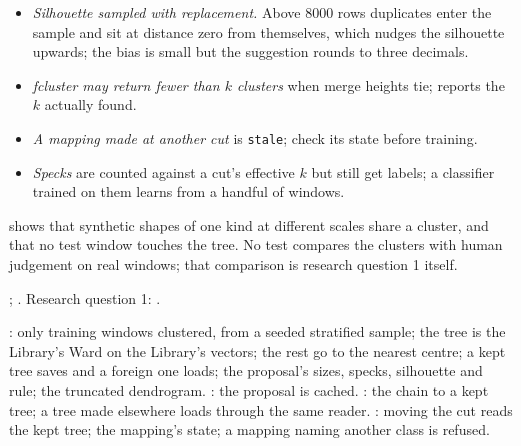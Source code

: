 \begin{itemize}
\item \emph{Silhouette sampled with replacement.} Above 8000 rows duplicates enter the sample and
  sit at distance zero from themselves, which nudges the silhouette upwards; the bias is small but
  the suggestion rounds to three decimals.
\item \emph{fcluster may return fewer than $k$ clusters} when merge heights tie; 
  reports the $k$ actually found.
\item \emph{A mapping made at another cut} is \texttt{stale}; check its state before training.
\item \emph{Specks} are counted against a cut's effective $k$ but still get labels; a classifier
  trained on them learns from a handful of windows.
\end{itemize}

 shows that synthetic shapes of one kind at different scales
share a cluster, and that no test window touches the tree. No test compares the clusters with
human judgement on real windows; that comparison is research question 1 itself.

\citet{ward1963hierarchical}; \citet{rousseeuw1987silhouettes}. Research question 1:
.

: only training windows clustered, from a seeded stratified
sample; the tree is the Library's Ward on the Library's vectors; the rest go to the nearest
centre; a kept tree saves and a foreign one loads; the proposal's sizes, specks, silhouette and
rule; the truncated dendrogram. : the proposal is cached.
: the chain to a kept tree; a tree made elsewhere loads through the
same reader. : moving the cut reads the kept tree; the
mapping's state; a mapping naming another class is refused.
